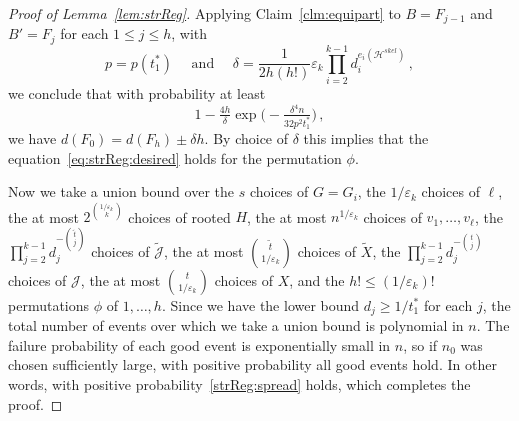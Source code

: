 \documentclass[12pt,a4paper]{amsart}
\let\eps\varepsilon
\newcommand{\Hy}{\mathcal{H}}
\newcommand{\cJ}{\mathcal{J}}
\newcommand{\Hskel}{\Hy^{skel}}
\begin{document}
\begin{proof}[Proof of Lemma~\ref{lem:strReg}]
Applying Claim~\ref{clm:equipart} to $B=F_{j-1}$ and $B'=F_j$ for each $1\le j\le h$, with
\[p=p(t_1^*)\quad\text{ and }\quad\delta=\frac{1}{2h(h!)}\eps_k\prod_{i=2}^{k-1}d_i^{e_i(\Hskel)}\,,\]
we conclude
that with probability at least
\[1- \tfrac{4h}{\delta}\exp\big(-\tfrac{\delta^4n}{32p^2t_1^*}\big)\,,\] 
we have $d(F_0)=d(F_{h})\pm \delta h$. By choice of $\delta$ this implies that the equation~\eqref{eq:strReg:desired} holds for the permutation $\phi$.

Now we take a union bound over the $s$ choices of $G=G_i$, the $1/\eps_k$ choices of $\ell$, the at most $2^{\binom{1/\eps_k}{k}}$ choices of rooted $H$, the at most $n^{1/\eps_k}$ choices of $v_1,\ldots,v_\ell$, the $\prod_{j=2}^{k-1}d_j^{-\binom{\tilde{t}}{j}}$ choices of $\tilde{\cJ}$, the at most $\binom{\tilde{t}}{1/\eps_k}$ choices of $\tilde{X}$, the $\prod_{j=2}^{k-1}d_j^{-\binom{t}{j}}$ choices of $\cJ$, the at most $\binom{t}{1/\eps_k}$ choices of $X$, and the $h! \leq (1/\eps_k)!$ permutations $\phi$ of $1, \dots, h$. Since we have the lower bound $d_j\ge 1/t_1^*$ for each $j$, the total number of events over which we take a union bound is polynomial in $n$. The failure probability of each good event is exponentially small in $n$, so if $n_0$ was chosen sufficiently large, with positive probability all good events hold. In other words, with positive probability~\ref{strReg:spread} holds, which completes the proof.
\end{proof}


 


 
\end{document}
